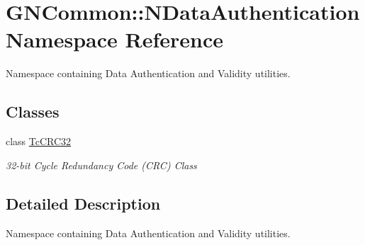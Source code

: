 \hypertarget{namespace_g_n_common_1_1_n_data_authentication}{}\section{G\+N\+Common\+:\+:N\+Data\+Authentication Namespace Reference}
\label{namespace_g_n_common_1_1_n_data_authentication}


Namespace containing Data Authentication and Validity utilities.  


\subsection*{Classes}
\begin{DoxyCompactItemize}
\item 
class \mbox{\hyperlink{class_g_n_common_1_1_n_data_authentication_1_1_tc_c_r_c32}{Tc\+C\+R\+C32}}
\begin{DoxyCompactList}\small\item\em 32-\/bit Cycle Redundancy Code (C\+RC) Class \end{DoxyCompactList}\end{DoxyCompactItemize}


\subsection{Detailed Description}
Namespace containing Data Authentication and Validity utilities. 